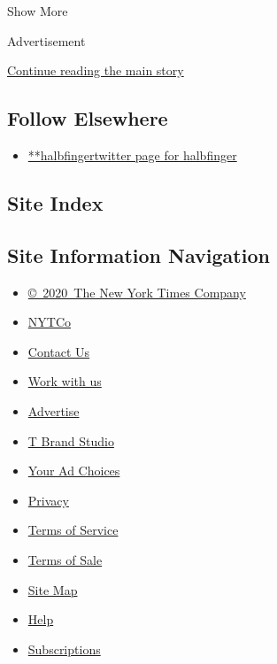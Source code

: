 Show More

Advertisement

\protect\hyperlink{after-mid2}{Continue reading the main story}

\hypertarget{follow-elsewhere}{%
\subsection{Follow Elsewhere}\label{follow-elsewhere}}

\begin{itemize}
\tightlist
\item
  \href{https://twitter.com/halbfinger}{**halbfingertwitter page for
  halbfinger}
\end{itemize}

\hypertarget{site-index}{%
\subsection{Site Index}\label{site-index}}

\hypertarget{site-information-navigation}{%
\subsection{Site Information
Navigation}\label{site-information-navigation}}

\begin{itemize}
\tightlist
\item
  \href{https://help.nytimes.com/hc/en-us/articles/115014792127-Copyright-notice}{©~2020~The
  New York Times Company}
\end{itemize}

\begin{itemize}
\tightlist
\item
  \href{https://www.nytco.com/}{NYTCo}
\item
  \href{https://help.nytimes.com/hc/en-us/articles/115015385887-Contact-Us}{Contact
  Us}
\item
  \href{https://www.nytco.com/careers/}{Work with us}
\item
  \href{https://nytmediakit.com/}{Advertise}
\item
  \href{http://www.tbrandstudio.com/}{T Brand Studio}
\item
  \href{https://www.nytimes.com/privacy/cookie-policy\#how-do-i-manage-trackers}{Your
  Ad Choices}
\item
  \href{https://www.nytimes.com/privacy}{Privacy}
\item
  \href{https://help.nytimes.com/hc/en-us/articles/115014893428-Terms-of-service}{Terms
  of Service}
\item
  \href{https://help.nytimes.com/hc/en-us/articles/115014893968-Terms-of-sale}{Terms
  of Sale}
\item
  \href{https://spiderbites.nytimes.com}{Site Map}
\item
  \href{https://help.nytimes.com/hc/en-us}{Help}
\item
  \href{https://www.nytimes.com/subscription?campaignId=37WXW}{Subscriptions}
\end{itemize}
